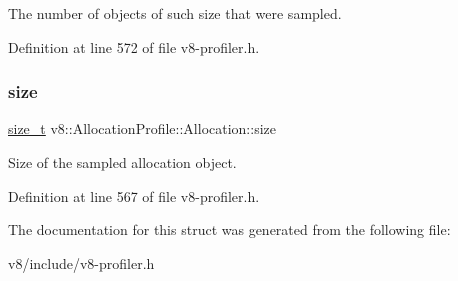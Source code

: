 The number of objects of such size that were sampled. 

Definition at line 572 of file v8-\/profiler.\+h.

\mbox{\label{structv8_1_1AllocationProfile_1_1Allocation_a346410fa5dfb796dff396069897c0aba}} 
\subsubsection{\texorpdfstring{size}{size}}
{\footnotesize\ttfamily \mbox{\hyperlink{classsize__t}{size\+\_\+t}} v8\+::\+Allocation\+Profile\+::\+Allocation\+::size}

Size of the sampled allocation object. 

Definition at line 567 of file v8-\/profiler.\+h.



The documentation for this struct was generated from the following file\+:\begin{DoxyCompactItemize}
\item 
v8/include/v8-\/profiler.\+h\end{DoxyCompactItemize}
